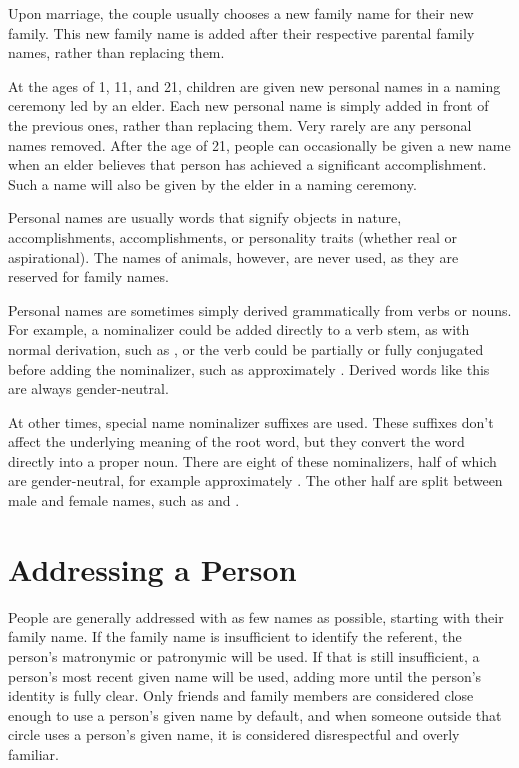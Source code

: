 Upon marriage, the couple usually chooses a new family name for their new family. This new family name is added after their respective parental family names, rather than replacing them.



At the ages of 1, 11, and 21, children are given new personal names in a naming ceremony led by an elder. Each new personal name is simply added in front of the previous ones, rather than replacing them. Very rarely are any personal names removed. After the age of 21, people can occasionally be given a new name when an elder believes that person has achieved a significant accomplishment. Such a name will also be given by the elder in a naming ceremony.

Personal names are usually words that signify objects in nature, accomplishments, accomplishments, or personality traits (whether real or aspirational). The names of animals, however, are never used, as they are reserved for family names.

Personal names are sometimes simply derived grammatically from verbs or nouns. For example, a nominalizer could be added directly to a verb stem, as with normal derivation, such as   , or the verb could be partially or fully conjugated before adding the nominalizer, such as   approximately . Derived words like this are always gender-neutral.

At other times, special name nominalizer suffixes are used. These suffixes don't affect the underlying meaning of the root word, but they convert the word directly into a proper noun. There are eight of these nominalizers, half of which are gender-neutral, for example   approximately . The other half are split between male and female names, such as    and   .


\section{Addressing a Person}
\label{sec:addressing-a-person}

People are generally addressed with as few names as possible, starting with their family name. If the family name is insufficient to identify the referent, the person's matronymic or patronymic will be used. If that is still insufficient, a person's most recent given name will be used, adding more until the person's identity is fully clear. Only friends and family members are considered close enough to use a person's given name by default, and when someone outside that circle uses a person's given name, it is considered disrespectful and overly familiar.

